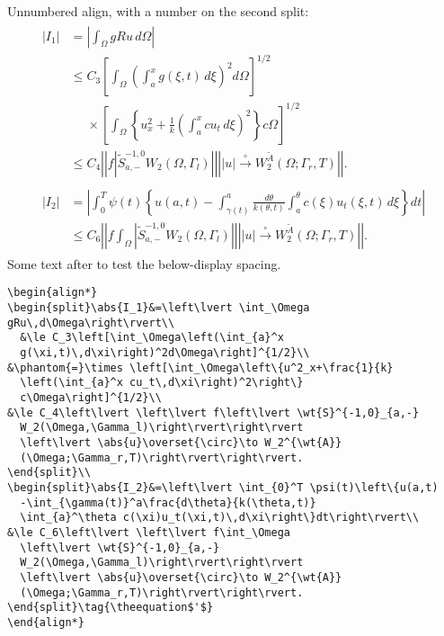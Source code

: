 \documentclass{article}
\newcommand{\ntt}{\normalfont\ttfamily}
\newcommand{\env}[1]{{\protect\ntt#1}}
\theoremstyle{definition}
\theoremstyle{remark}
\newcommand{\wt}{\widetilde}
\newcommand{\envert}[1]{\left\lvert#1\right\rvert}
\let\abs=\envert
\begin{document}

\newpage
Unnumbered \env{align}, with a number on the second \env{split}:
\begin{align*}
\begin{split}\abs{I_1}&=\left\lvert \int_\Omega gRu\,d\Omega\right\rvert\\
  &\le C_3\left[\int_\Omega\left(\int_{a}^x
  g(\xi,t)\,d\xi\right)^2d\Omega\right]^{1/2}\\
&\phantom{=}\times \left[\int_\Omega\left\{u^2_x+\frac{1}{k}
  \left(\int_{a}^x cu_t\,d\xi\right)^2\right\}
  c\Omega\right]^{1/2}\\
&\le C_4\left\lvert \left\lvert f\left\lvert \wt{S}^{-1,0}_{a,-}
  W_2(\Omega,\Gamma_l)\right\rvert\right\rvert
  \left\lvert \abs{u}\overset{\circ}\to W_2^{\wt{A}}
  (\Omega;\Gamma_r,T)\right\rvert\right\rvert.
\end{split}\\
\begin{split}\abs{I_2}&=\left\lvert \int_{0}^T \psi(t)\left\{u(a,t)
  -\int_{\gamma(t)}^a\frac{d\theta}{k(\theta,t)}
  \int_{a}^\theta c(\xi)u_t(\xi,t)\,d\xi\right\}dt\right\rvert\\
&\le C_6\left\lvert \left\lvert f\int_\Omega
  \left\lvert \wt{S}^{-1,0}_{a,-}
  W_2(\Omega,\Gamma_l)\right\rvert\right\rvert
  \left\lvert \abs{u}\overset{\circ}\to W_2^{\wt{A}}
  (\Omega;\Gamma_r,T)\right\rvert\right\rvert.
\end{split}\tag{\theequation$'$}
\end{align*}
Some text after to test the below-display spacing.

\begin{verbatim}
\begin{align*}
\begin{split}\abs{I_1}&=\left\lvert \int_\Omega gRu\,d\Omega\right\rvert\\
  &\le C_3\left[\int_\Omega\left(\int_{a}^x
  g(\xi,t)\,d\xi\right)^2d\Omega\right]^{1/2}\\
&\phantom{=}\times \left[\int_\Omega\left\{u^2_x+\frac{1}{k}
  \left(\int_{a}^x cu_t\,d\xi\right)^2\right\}
  c\Omega\right]^{1/2}\\
&\le C_4\left\lvert \left\lvert f\left\lvert \wt{S}^{-1,0}_{a,-}
  W_2(\Omega,\Gamma_l)\right\rvert\right\rvert
  \left\lvert \abs{u}\overset{\circ}\to W_2^{\wt{A}}
  (\Omega;\Gamma_r,T)\right\rvert\right\rvert.
\end{split}\\
\begin{split}\abs{I_2}&=\left\lvert \int_{0}^T \psi(t)\left\{u(a,t)
  -\int_{\gamma(t)}^a\frac{d\theta}{k(\theta,t)}
  \int_{a}^\theta c(\xi)u_t(\xi,t)\,d\xi\right\}dt\right\rvert\\
&\le C_6\left\lvert \left\lvert f\int_\Omega
  \left\lvert \wt{S}^{-1,0}_{a,-}
  W_2(\Omega,\Gamma_l)\right\rvert\right\rvert
  \left\lvert \abs{u}\overset{\circ}\to W_2^{\wt{A}}
  (\Omega;\Gamma_r,T)\right\rvert\right\rvert.
\end{split}\tag{\theequation$'$}
\end{align*}
\end{verbatim}
\end{document}
